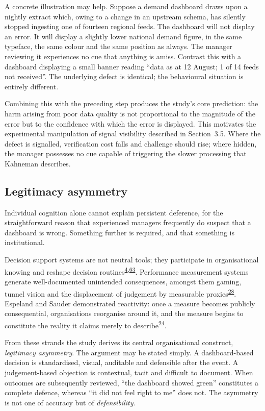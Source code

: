 \documentclass[11pt,a4paper]{article}
\numberwithin{figure}{section}
\numberwithin{table}{section}
\begin{document}
A concrete illustration may help. Suppose a demand dashboard draws upon a nightly extract which, owing to a
change in an upstream schema, has silently stopped ingesting one of fourteen regional feeds. The dashboard
will not display an error. It will display a slightly lower national demand figure, in the same typeface,
the same colour and the same position as always. The manager reviewing it experiences no cue that anything
is amiss. Contrast this with a dashboard displaying a small banner reading ``data as at 12 August; 1 of 14
feeds not received''. The underlying defect is identical; the behavioural situation is entirely different.

Combining this with the preceding step produces the study's core prediction: the harm arising from poor
data quality is not proportional to the magnitude of the error but to the confidence with which the error
is displayed. This motivates the experimental manipulation of signal visibility described in Section~3.5.
Where the defect is signalled, verification cost falls and challenge should rise; where hidden, the manager
possesses no cue capable of triggering the slower processing that Kahneman describes.

\subsection{Legitimacy asymmetry}

Individual cognition alone cannot explain persistent deference, for the straightforward reason that
experienced managers frequently do suspect that a dashboard is wrong. Something further is required, and
that something is institutional.

Decision support systems are not neutral tools; they participate in organisational knowing and reshape
decision routines\textsuperscript{\hyperlink{ref4}{4},\hyperlink{ref63}{63}}. Performance measurement systems generate well-documented
unintended consequences, amongst them gaming, tunnel vision and the displacement of judgement by measurable
proxies\textsuperscript{\hyperlink{ref28}{28}}. Espeland and Sauder demonstrated reactivity: once a measure becomes publicly
consequential, organisations reorganise around it, and the measure begins to constitute the reality it
claims merely to describe\textsuperscript{\hyperlink{ref24}{24}}.

From these strands the study derives its central organisational construct, \emph{legitimacy asymmetry}. The
argument may be stated simply. A dashboard-based decision is standardised, visual, auditable and defensible
after the event. A judgement-based objection is contextual, tacit and difficult to document. When outcomes
are subsequently reviewed, ``the dashboard showed green'' constitutes a complete defence, whereas ``it did
not feel right to me'' does not. The asymmetry is not one of accuracy but of \emph{defensibility}.
\end{document}
